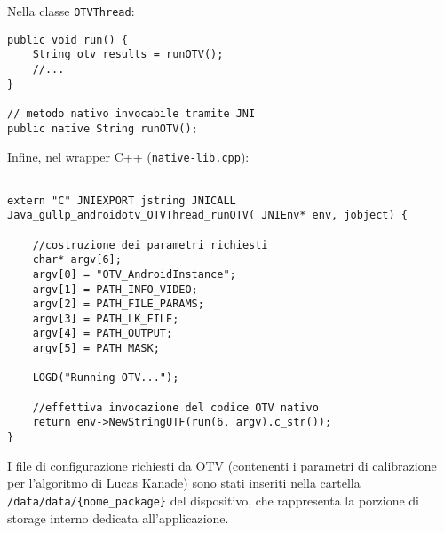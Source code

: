 Nella classe \texttt{OTVThread}:

\begin{verbatim}
public void run() {
    String otv_results = runOTV();
    //...
}

// metodo nativo invocabile tramite JNI
public native String runOTV();
\end{verbatim}

\vspace{1em}

Infine, nel wrapper C++ (\texttt{native-lib.cpp}):

\vspace{1em}

\begin{verbatim}

extern "C" JNIEXPORT jstring JNICALL 
Java_gullp_androidotv_OTVThread_runOTV( JNIEnv* env, jobject) {

    //costruzione dei parametri richiesti
    char* argv[6];
    argv[0] = "OTV_AndroidInstance";
    argv[1] = PATH_INFO_VIDEO;
    argv[2] = PATH_FILE_PARAMS;
    argv[3] = PATH_LK_FILE;
    argv[4] = PATH_OUTPUT;
    argv[5] = PATH_MASK;

    LOGD("Running OTV...");

    //effettiva invocazione del codice OTV nativo
    return env->NewStringUTF(run(6, argv).c_str());
}

\end{verbatim}

\vspace{1em}

I file di configurazione richiesti da OTV (contenenti i parametri di calibrazione per l'algoritmo di Lucas Kanade)
sono stati inseriti nella cartella \texttt{/data/data/\{nome\_package\}} del dispositivo, che rappresenta la porzione di 
storage interno dedicata all'applicazione.